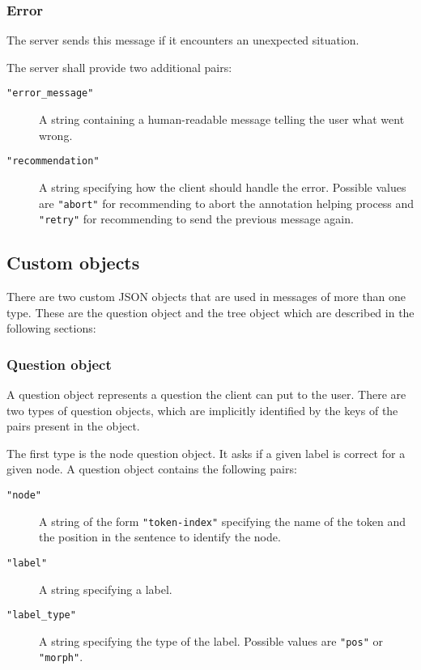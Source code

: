 \documentclass{scrartcl}
\newcommand{\jsstring}[1]{\texttt{\color{OrangeRed}"#1"}}
\begin{document}
\subsubsection{Error}
\label{ssub:Error}

The server sends this message if it encounters an unexpected situation.

The server shall provide two additional pairs:
\begin{description}
    \item[\jsstring{error\_message}] A string containing a human-readable message telling the user what went wrong.
    \item[\jsstring{recommendation}] A string specifying how the client should handle the error.
        Possible values are \jsstring{abort} for recommending to abort the annotation helping process and \jsstring{retry} for recommending to send the previous message again.
\end{description}

\subsection{Custom objects}
\label{sub:Custom objects}

There are two custom JSON objects that are used in messages of more than one type.
These are the question object and the tree object which are described in the following sections:

\subsubsection{Question object}
\label{ssub:Question object}

A question object represents a question the client can put to the user.
There are two types of question objects, which are implicitly identified by the keys of the pairs present in the object.

The first type is the node question object.
It asks if a given label is correct for a given node.
A question object contains the following pairs:
\begin{description}
    \item[\jsstring{node}] A string of the form \jsstring{token-index} specifying the name of the token and the position in the sentence to identify the node.
    \item[\jsstring{label}] A string specifying a label.
    \item[\jsstring{label\_type}] A string specifying the type of the label.
        Possible values are \jsstring{pos} or \jsstring{morph}.
\end{description}
\end{document}
